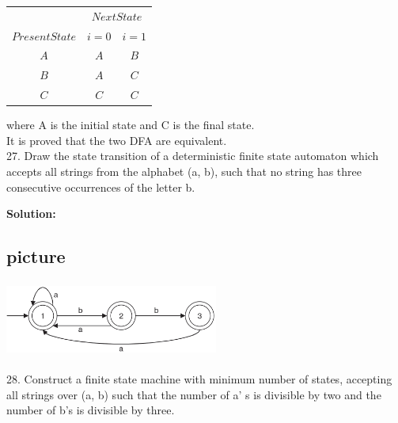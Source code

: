 \vspace*{0.2cm}
\begin{center}
	\begin{tabular}{ccc}
		\hline
		
		\hline
		
		\hline
		
		\hline
		& \multicolumn{2}{c}{$Next State$}\\
		\cline{2-3}
		$Present State$ &  $i=0$ & $i=1$\\
		\hline
		$A$   &   $A$      &  $B$ \\
		$B$   &   $A$      &  $C$   \\
		$C$   &   $C$      &  $C$   \\
		\hline
		
		\hline
		
		\hline
		
		\hline
	\end{tabular}
\end{center}

\vspace*{0.2cm}
where A is the initial state and C is the final state.\\
\hspace*{0.5cm} It is proved that the two DFA are equivalent.\\

27. Draw the state transition of a deterministic finite state automaton which accepts all strings from
the alphabet (a, b), such that no string has three consecutive occurrences of the letter b.\\
\begin{flushright}
	[GATE 1993]
\end{flushright}


\textbf{Solution:}\\

\begin{center}
	\section{picture}
	\includegraphics[width=7cm,height=2.5cm]{./pictures/118.png}
\end{center}


28. Construct a finite state machine with minimum number of states, accepting all strings over (a, b)
such that the number of a' s is divisible by two and the number of b's is divisible by three.\\
\begin{flushright}
	[GATE 1997]
\end{flushright}


